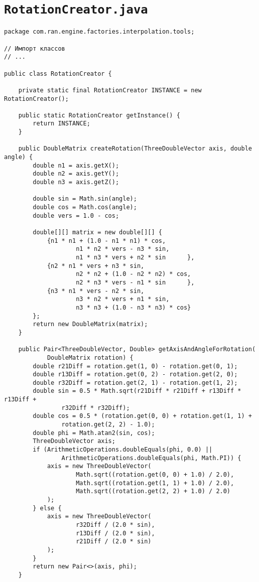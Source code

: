 \section*{\texttt{RotationCreator.java}}
\begin{verbatim}
package com.ran.engine.factories.interpolation.tools;

// Импорт классов
// ...

public class RotationCreator {

    private static final RotationCreator INSTANCE = new RotationCreator();

    public static RotationCreator getInstance() {
        return INSTANCE;
    }

    public DoubleMatrix createRotation(ThreeDoubleVector axis, double angle) {
        double n1 = axis.getX();
        double n2 = axis.getY();
        double n3 = axis.getZ();

        double sin = Math.sin(angle);
        double cos = Math.cos(angle);
        double vers = 1.0 - cos;

        double[][] matrix = new double[][] {
            {n1 * n1 + (1.0 - n1 * n1) * cos,
                    n1 * n2 * vers - n3 * sin,
                    n1 * n3 * vers + n2 * sin      },
            {n2 * n1 * vers + n3 * sin,
                    n2 * n2 + (1.0 - n2 * n2) * cos,
                    n2 * n3 * vers - n1 * sin      },
            {n3 * n1 * vers - n2 * sin,
                    n3 * n2 * vers + n1 * sin,
                    n3 * n3 + (1.0 - n3 * n3) * cos}
        };
        return new DoubleMatrix(matrix);
    }

    public Pair<ThreeDoubleVector, Double> getAxisAndAngleForRotation(
            DoubleMatrix rotation) {
        double r21Diff = rotation.get(1, 0) - rotation.get(0, 1);
        double r13Diff = rotation.get(0, 2) - rotation.get(2, 0);
        double r32Diff = rotation.get(2, 1) - rotation.get(1, 2);
        double sin = 0.5 * Math.sqrt(r21Diff * r21Diff + r13Diff * r13Diff +
                r32Diff * r32Diff);
        double cos = 0.5 * (rotation.get(0, 0) + rotation.get(1, 1) +
                rotation.get(2, 2) - 1.0);
        double phi = Math.atan2(sin, cos);
        ThreeDoubleVector axis;
        if (ArithmeticOperations.doubleEquals(phi, 0.0) ||
                ArithmeticOperations.doubleEquals(phi, Math.PI)) {
            axis = new ThreeDoubleVector(
                    Math.sqrt((rotation.get(0, 0) + 1.0) / 2.0),
                    Math.sqrt((rotation.get(1, 1) + 1.0) / 2.0),
                    Math.sqrt((rotation.get(2, 2) + 1.0) / 2.0)
            );
        } else {
            axis = new ThreeDoubleVector(
                    r32Diff / (2.0 * sin),
                    r13Diff / (2.0 * sin),
                    r21Diff / (2.0 * sin)
            );
        }
        return new Pair<>(axis, phi);
    }


\end{verbatim}
